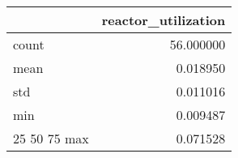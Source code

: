 \begin{tabular}{lr}
\toprule
 & reactor\_utilization \\
\midrule
count & 56.000000 \\
mean & 0.018950 \\
std & 0.011016 \\
min & 0.009487 \\
25%
50%
75%
max & 0.071528 \\
\bottomrule
\end{tabular}

